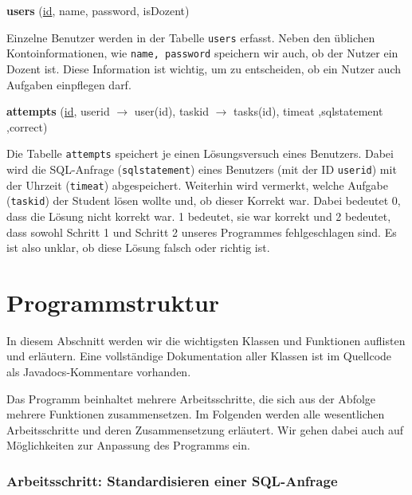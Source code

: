 \textbf{users} (\underline{id}, name, password, isDozent)

Einzelne Benutzer werden in der Tabelle \verb|users| erfasst. Neben den üblichen Kontoinformationen, wie \verb|name, password| speichern wir auch, ob der Nutzer ein Dozent ist. Diese Information ist wichtig, um zu entscheiden, ob ein Nutzer auch Aufgaben einpflegen darf.

\textbf{attempts} (\underline{id}, userid $\to$ user(id), taskid $\to$ tasks(id), timeat ,sqlstatement ,correct)

Die Tabelle \verb|attempts| speichert je einen Lösungsversuch eines Benutzers. Dabei wird die SQL-Anfrage (\verb|sqlstatement|) eines Benutzers (mit der ID \verb|userid|) mit der Uhrzeit (\verb|timeat|) abgespeichert. Weiterhin wird vermerkt, welche Aufgabe (\verb|taskid|) der Student lösen wollte und, ob dieser Korrekt war. Dabei bedeutet 0, dass die Lösung nicht korrekt war. 1 bedeutet, sie war korrekt und 2 bedeutet, dass sowohl Schritt 1 und Schritt 2 unseres Programmes fehlgeschlagen sind. Es ist also unklar, ob diese Lösung falsch oder richtig ist.

\section{Programmstruktur}

In diesem Abschnitt werden wir die wichtigsten Klassen und Funktionen auflisten und erläutern. Eine vollständige Dokumentation aller Klassen ist im Quellcode als Javadocs-Kommentare vorhanden. 

Das Programm beinhaltet mehrere Arbeitsschritte, die sich aus der Abfolge mehrere Funktionen zusammensetzen. Im Folgenden werden alle wesentlichen Arbeitsschritte und deren Zusammensetzung erläutert. Wir gehen dabei auch auf Möglichkeiten zur Anpassung des Programms ein.

\subsubsection{Arbeitsschritt: Standardisieren einer SQL-Anfrage} 

